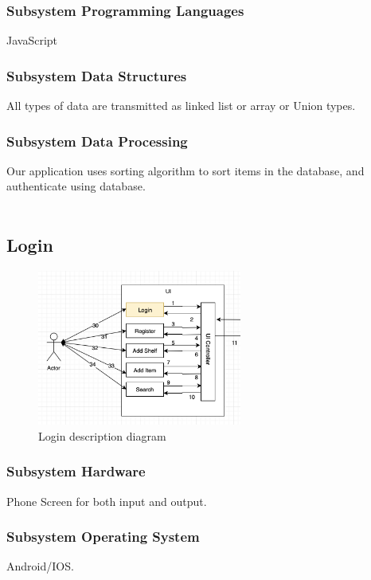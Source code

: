 \subsubsection{Subsystem Programming Languages}
JavaScript

\subsubsection{Subsystem Data Structures}
All types of data are transmitted as linked list or array or Union types.

\subsubsection{Subsystem Data Processing}
Our application uses sorting algorithm to sort items in the database, and authenticate using database.
\\
\\
\subsection{Login}


\begin{figure}[h!]
	\centering
 	\includegraphics[width=0.60\textwidth]{images/login}
 \caption{Login description diagram}
\end{figure}

\subsubsection{Subsystem Hardware}
Phone Screen for both input and output.

\subsubsection{Subsystem Operating System}
Android/IOS.

